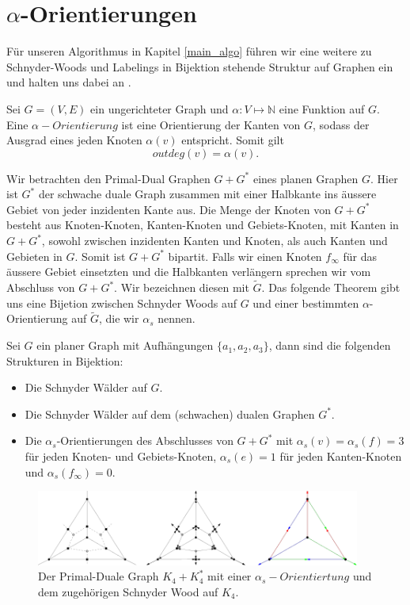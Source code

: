 \section{$\alpha$-Orientierungen}\label{alpha_orientations}

Für unseren Algorithmus in Kapitel \ref{main_algo} führen wir eine weitere zu Schnyder-Woods und Labelings in Bijektion stehende Struktur auf Graphen ein und halten uns dabei an \cite{felsner04}.

Sei $G=(V,E)$ ein ungerichteter Graph und $\alpha:V\mapsto\mathbb{N}$ eine Funktion auf $G$. Eine $\alpha-Orientierung$ ist eine Orientierung der Kanten von $G$, sodass der Ausgrad eines jeden Knoten $\alpha(v)$ entspricht. Somit gilt $$outdeg(v) = \alpha(v).$$

Wir betrachten den Primal-Dual Graphen $G+G^*$ eines planen Graphen $G$. Hier ist $G^*$ der schwache duale Graph zusammen mit einer Halbkante ins äussere Gebiet von jeder inzidenten Kante aus. Die Menge der Knoten von $G+G^*$ besteht aus Knoten-Knoten, Kanten-Knoten und Gebiets-Knoten, mit Kanten in $G+G^*$, sowohl zwischen inzidenten Kanten und Knoten, als auch Kanten und Gebieten in $G$. Somit ist $G+G^*$ bipartit. Falls wir einen Knoten $f_\infty$ für das äussere Gebiet einsetzten und die Halbkanten verlängern sprechen wir vom Abschluss von $G+G^*$. Wir bezeichnen diesen mit $\tilde{G}$. Das folgende Theorem gibt uns eine Bijetion zwischen Schnyder Woods auf $G$ und einer bestimmten $\alpha$-Orientierung auf $\tilde{G}$, die wir $\alpha_s$ nennen.

\begin{theorem}\label{alpha_bij}
Sei $G$ ein planer Graph mit Aufhängungen $\{a_1,a_2,a_3\}$, dann sind die folgenden Strukturen in Bijektion:
\begin{itemize}
\item Die Schnyder Wälder auf $G$.
\item Die Schnyder Wälder auf dem (schwachen) dualen Graphen $G^*$.
\item Die $\alpha_{s}$-Orientierungen des Abschlusses von $G+G^*$ mit $\alpha_s(v) = \alpha_s(f) = 3$ für jeden Knoten- und Gebiets-Knoten,  $\alpha_s(e) = 1$ für jeden Kanten-Knoten und  $\alpha_s(f_\infty) = 0$.
\end{itemize}
\end{theorem}

\begin{figure}[h]
	\centering
  \includegraphics[width=0.95\textwidth]{alpha_ex.png}
  \caption{Der Primal-Duale Graph $K_4+K_4^*$ mit einer $\alpha_s-Orientiertung$ und dem zugehörigen Schnyder Wood auf $K_4$. }
\end{figure}